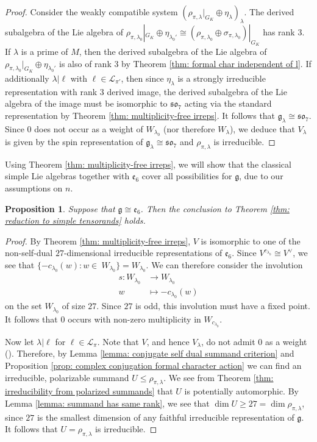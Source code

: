 \documentclass{amsart}
\newtheorem{proposition}[theorem]{Proposition}
\theoremstyle{definition}
\numberwithin{equation}{section} %
\newcommand{\solie}{\mathfrak{so}}
\newcommand{\mf}[1]{\mathfrak{#1}}
\begin{document}
\begin{proof}
Consider the weakly compatible system $(\rho_{\pi,\lambda}|_{G_K} \oplus \eta_\lambda)_\lambda$.
The derived subalgebra of the Lie algebra of $\rho_{\pi,\lambda_0}|_{G_K} \oplus \eta_{\lambda_0'} \cong (\rho_{\pi,\lambda_0} \oplus \sigma_{\pi,\lambda_0})|_{G_K}$ has rank $3$.
If $\lambda$ is a prime of $M$, then the derived subalgebra of the Lie algebra of $\rho_{\pi,\lambda_0}|_{G_K} \oplus \eta_{\lambda_0'}$ is also of rank $3$ by Theorem \ref{thm: formal char independent of l}.
If additionally $\lambda|\ell$ with $\ell \in \mathcal{L}_{\pi'}$, then since $\eta_\lambda$ is a strongly irreducible representation with rank $3$ derived image, the derived subalgebra of the Lie algebra of the image must be isomorphic to $\solie_7$ acting via the standard representation by Theorem \ref{thm: multiplicity-free irreps}.
It follows that $\mf{g}_\lambda \cong \solie_7$.
Since $0$ does not occur as a weight of $W_{\lambda_0}$ (nor therefore $W_\lambda$), we deduce that $V_\lambda$ is given by the spin representation of $\mf{g}_\lambda \cong \solie_7$ and $\rho_{\pi,\lambda}$ is irreducible.
\end{proof}


Using Theorem \ref{thm: multiplicity-free irreps}, we will show that the classical simple Lie algebras together with $\mf{e}_6$ cover all possibilities for $\mf{g}$, due to our assumptions on $n$.

\begin{proposition} \label{prop: e_6 irred}
Suppose that $\mf{g} \cong \mf{e}_6$.
Then the conclusion to Theorem \ref{thm: reduction to simple tensorands} holds.
\end{proposition}
\begin{proof}
By Theorem \ref{thm: multiplicity-free irreps}, $V$ is isomorphic to one of the non-self-dual $27$-dimensional irreducible representations of $\mf{e}_6$.
Since $V^{c_{\lambda_0}} \cong V^\vee$, we see that 
$\{-c_{\lambda_0}(w): w \in~W_{\lambda_0}\} = W_{\lambda_0} $.
We can therefore consider the involution 
\begin{align*}
s: W_{\lambda_0} &\to W_{\lambda_0} \\
w &\mapsto -c_{\lambda_0}(w)
\end{align*}
on the set $W_{\lambda_0}$ of size $27$.
Since $27$ is odd, this involution must have a fixed point.
It follows that $0$ occurs with non-zero multiplicity in $W_{c_{\lambda_0}}$.

Now let $\lambda| \ell$ for $\ell \in \mathcal{L}_\pi$.
Note that $V$, and hence $V_\lambda$, do not admit $0$ as a weight (\cite[\S 4.1]{boxer2019e6}).
Therefore, by Lemma \ref{lemma: conjugate self dual summand criterion} and Proposition \ref{prop: complex conjugation formal character action} we can find an irreducible, polarizable summand $U \leq \rho_{\pi,\lambda}$.
We see from Theorem \ref{thm: irreducibility from polarized summands} that $U$ is potentially automorphic.
By Lemma \ref{lemma: summand has same rank}, we see that $\dim U \geq 27 = \dim \rho_{\pi,\lambda}$, since $27$ is the smallest dimension of any faithful irreducible representation of $\mf{g}$.
It follows that $U = \rho_{\pi,\lambda}$ is irreducible.
\end{proof}
\end{document}
